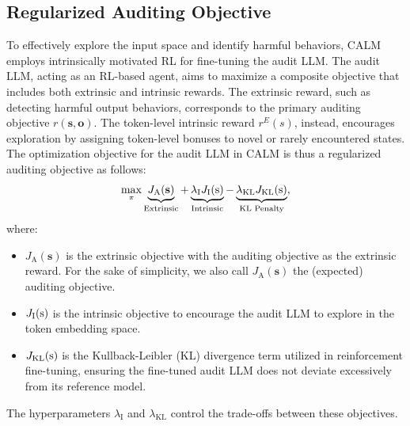 \documentclass[letterpaper]{article} %
\newcommand{\ours}{\textsf{CALM}}
\def\rs{{\textnormal{s}}}
\def\rvo{{\mathbf{o}}}
\def\rvs{{\mathbf{s}}}
\begin{document}
\subsection{Regularized Auditing Objective}

To effectively explore the input space and identify harmful behaviors, {\ours} employs intrinsically motivated RL for fine-tuning the audit LLM. The audit LLM, acting as an RL-based agent, aims to maximize a composite objective that includes both extrinsic and intrinsic rewards. The extrinsic reward, such as detecting harmful output behaviors, corresponds to the primary auditing objective $r(\rvs,\rvo)$. The token-level intrinsic reward \( r^{E}(s) \), instead, encourages exploration by assigning token-level bonuses to novel or rarely encountered states. The optimization objective for the audit LLM in {\ours} is thus a regularized auditing objective as follows:
\begin{equation}
    \max_\pi \underbrace{J_\text{A}(\rvs)}_{\text{Extrinsic}} + \underbrace{\lambda_\text{I} J_\text{I}(\rs)}_{\text{Intrinsic}} - \underbrace{\lambda_\text{KL} J_\text{KL}(\rs)}_{\text{KL Penalty}},
\end{equation}
where:
\begin{itemize}
    \item $J_\text{A}(\rvs)$ is the extrinsic objective with the auditing objective as the extrinsic reward. For the sake of simplicity, we also call $J_\text{A}(\rvs)$ the (expected) auditing objective.
    \item $J_\text{I}(\rs)$ is the intrinsic objective to encourage the audit LLM to explore in the token embedding space.
    \item $J_\text{KL}(\rs)$ is the Kullback-Leibler (KL) divergence term utilized in reinforcement fine-tuning, ensuring the fine-tuned audit LLM does not deviate excessively from its reference model.
\end{itemize}
The hyperparameters $\lambda_\text{I}$ and $\lambda_\text{KL}$ control the trade-offs between these objectives. 
\end{document}
